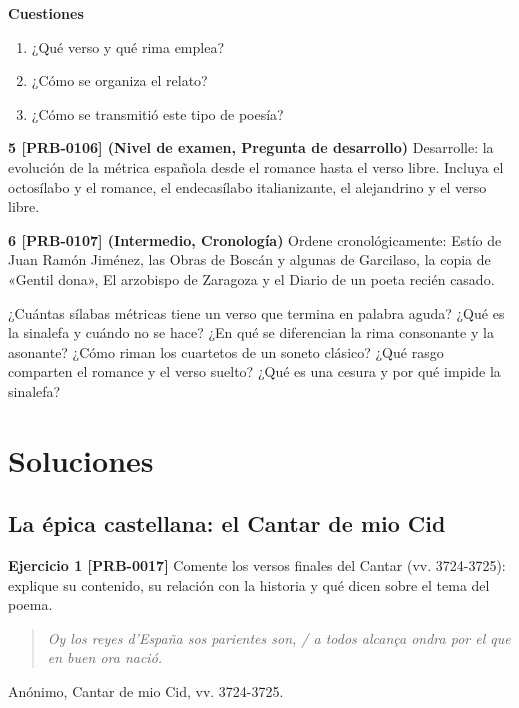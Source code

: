 \documentclass{book}
\begin{document}
\begin{tcolorbox}[title={Ejercicios}, studiumworked, breakable]
\noindent\textbf{Cuestiones}
\begin{enumerate}
\item ¿Qué verso y qué rima emplea?
\item ¿Cómo se organiza el relato?
\item ¿Cómo se transmitió este tipo de poesía?
\end{enumerate}

\noindent\textbf{5 [PRB-0106] (Nivel de examen, Pregunta de desarrollo)}
Desarrolle: la evolución de la métrica española desde el romance hasta el verso libre. Incluya el octosílabo y el romance, el endecasílabo italianizante, el alejandrino y el verso libre.


\noindent\textbf{6 [PRB-0107] (Intermedio, Cronología)}
Ordene cronológicamente: Estío de Juan Ramón Jiménez, las Obras de Boscán y algunas de Garcilaso, la copia de «Gentil dona», El arzobispo de Zaragoza y el Diario de un poeta recién casado.

\end{tcolorbox}

\begin{tcolorbox}[title={Autoficha}, studiumcheck, breakable]

¿Cuántas sílabas métricas tiene un verso que termina en palabra aguda? ¿Qué es la sinalefa y cuándo no se hace? ¿En qué se diferencian la rima consonante y la asonante? ¿Cómo riman los cuartetos de un soneto clásico? ¿Qué rasgo comparten el romance y el verso suelto? ¿Qué es una cesura y por qué impide la sinalefa?

\end{tcolorbox}
\appendix
\chapter{Soluciones}

\section{La épica castellana: el Cantar de mio Cid}

\noindent\textbf{Ejercicio 1 [PRB-0017]}
Comente los versos finales del Cantar (vv. 3724-3725): explique su contenido, su relación con la historia y qué dicen sobre el tema del poema.


\begin{quote}
\itshape Oy los reyes d'España sos parientes son, / a todos alcança ondra por el que en buen ora nació.
\end{quote}
{\noindent\footnotesize Anónimo, Cantar de mio Cid, vv. 3724-3725.\par}
\end{document}
